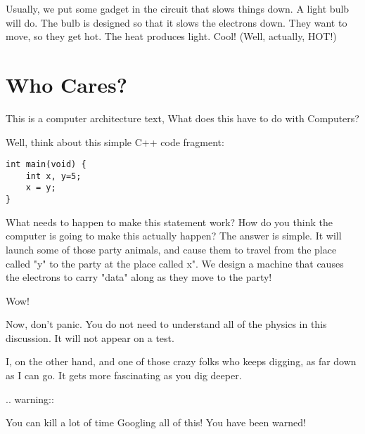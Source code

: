     Usually, we put some gadget in the circuit that slows things down. A light
    bulb will do. The bulb is designed so that it slows the electrons down.
    They want to move, so they get hot. The heat produces light. Cool! (Well,
    actually, HOT!)


\section{Who Cares?}

This is a computer architecture text, What does this have to do with
Computers?

Well, think about this simple C++ code fragment:

\begin{verbatim}
int main(void) {
    int x, y=5;
    x = y;
}
\end{verbatim}

What needs to happen to make this statement work? How do you think the
computer is going to make this actually happen? The answer is simple. It will
launch some of those party animals, and cause them to travel from the place
called "y" to the party at the place called x". We design a machine that
causes the electrons to carry "data" along as they move to the party!

Wow!

Now, don't panic. You do not need to understand all of the physics in this
discussion. It will not appear on a test. 

I, on the other hand, and one of those crazy folks who keeps digging, as far
down as I can go. It gets more fascinating as you dig deeper. 

..  warning::

    You can kill a lot of time Googling all of this! You have been warned!














